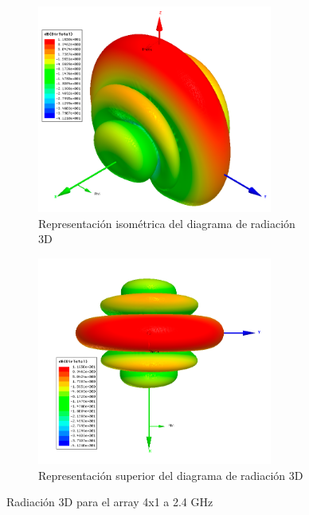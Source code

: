 \begin{figure}[H]
     \centering
     \begin{subfigure}[b]{0.7\textwidth}
         \centering
         \includegraphics[width=0.85\textwidth]{archivos/analisis/4x11/6}
         \caption{Representación isométrica del diagrama de radiación 3D}
         \label{fig:3d14x11}
     \end{subfigure}
     \hfill
     \begin{subfigure}[b]{0.7\textwidth}
         \centering
         \includegraphics[width=0.85\textwidth]{archivos/analisis/4x11/7}
         \caption{Representación superior del diagrama de radiación 3D}
         \label{fig:3d24x11}
     \end{subfigure}
     \hfill
        \caption{Radiación 3D para el array 4x1 a 2.4 GHz}
        \label{fig:3d4x11}
\end{figure}

